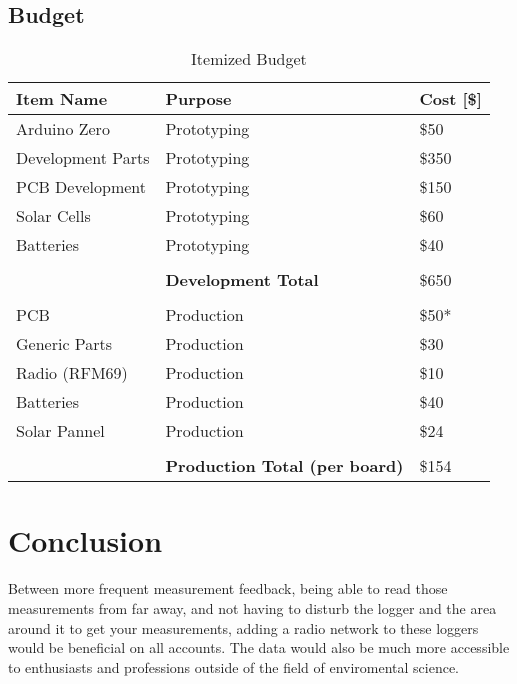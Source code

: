 \documentclass[12pt]{article}
\begin{document}
\subsection{Budget}
\begin{table}[H]
\centering
\caption{Itemized Budget}
\label{my-label}
\begin{tabular}{lll}
\textbf{Item Name}         & \textbf{Purpose}                      & \textbf{Cost {[}\${]}} \\
\hline
Arduino Zero      & Prototyping                  & \$50          \\
Development Parts & Prototyping                  & \$350         \\
PCB Development   & Prototyping                  & \$150         \\
Solar Cells       & Prototyping                  & \$60          \\
Batteries         & Prototyping                  & \$40          \\
\hline
                  &                              &               \\
                   & \textbf{Development Total}            & \$650         \\
                   &								 &\\
PCB               & Production                   & \$50*         \\
Generic Parts     & Production                   & \$30          \\
Radio (RFM69)     & Production                   & \$10          \\
Batteries         & Production                   & \$40          \\
Solar Pannel      & Production                   & \$24          \\
\hline
                  &                              &               \\

                  & \textbf{Production Total (per board)} & \$154
\end{tabular}
\end{table}


\section{Conclusion}
Between more frequent measurement feedback, being able to read those measurements from far away, and not having to disturb the logger and the area around it to get your measurements, adding a radio network to these loggers would be beneficial on all accounts.  The data would also be much more accessible to enthusiasts and professions outside of the field of enviromental science.
\end{document}
